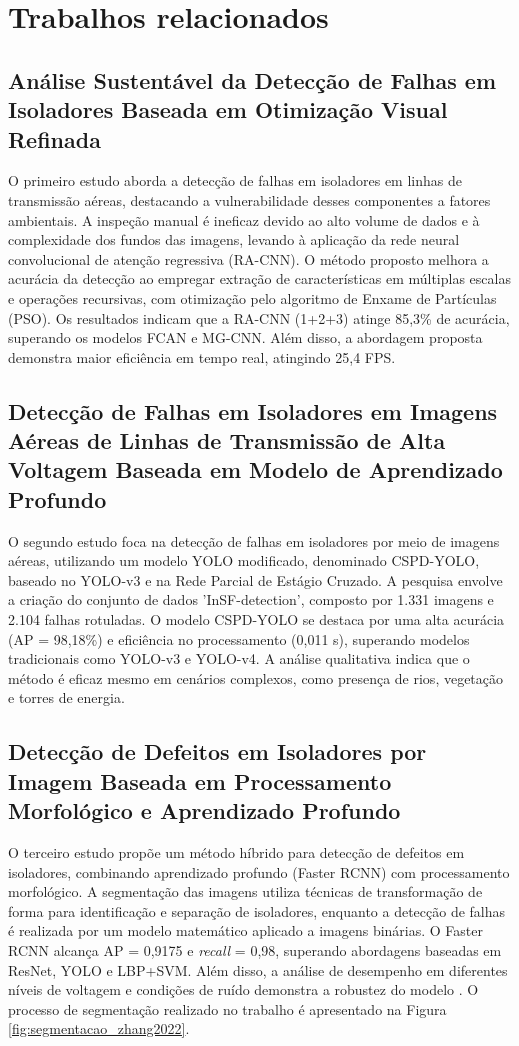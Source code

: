 \chapter{Trabalhos relacionados}

\section{Análise Sustentável da Detecção de Falhas em Isoladores Baseada em Otimização Visual Refinada}
O primeiro estudo aborda a detecção de falhas em isoladores em linhas de transmissão aéreas, destacando a vulnerabilidade desses componentes a fatores ambientais. A inspeção manual é ineficaz devido ao alto volume de dados e à complexidade dos fundos das imagens, levando à aplicação da rede neural convolucional de atenção regressiva (RA-CNN). O método proposto melhora a acurácia da detecção ao empregar extração de características em múltiplas escalas e operações recursivas, com otimização pelo algoritmo de Enxame de Partículas (PSO). Os resultados indicam que a RA-CNN (1+2+3) atinge 85,3\% de acurácia, superando os modelos FCAN e MG-CNN. Além disso, a abordagem proposta demonstra maior eficiência em tempo real, atingindo 25,4 FPS. \cite{wang2023}

\section{Detecção de Falhas em Isoladores em Imagens Aéreas de Linhas de Transmissão de Alta Voltagem Baseada em Modelo de Aprendizado Profundo}
O segundo estudo foca na detecção de falhas em isoladores por meio de imagens aéreas, utilizando um modelo YOLO modificado, denominado CSPD-YOLO, baseado no YOLO-v3 e na Rede Parcial de Estágio Cruzado. A pesquisa envolve a criação do conjunto de dados 'InSF-detection', composto por 1.331 imagens e 2.104 falhas rotuladas. O modelo CSPD-YOLO se destaca por uma alta acurácia (AP = 98,18\%) e eficiência no processamento (0,011 s), superando modelos tradicionais como YOLO-v3 e YOLO-v4. A análise qualitativa indica que o método é eficaz mesmo em cenários complexos, como presença de rios, vegetação e torres de energia. \cite{liu2021}

\section{Detecção de Defeitos em Isoladores por Imagem Baseada em Processamento Morfológico e Aprendizado Profundo}
O terceiro estudo propõe um método híbrido para detecção de defeitos em isoladores, combinando aprendizado profundo (Faster RCNN) com processamento morfológico. A segmentação das imagens utiliza técnicas de transformação de forma para identificação e separação de isoladores, enquanto a detecção de falhas é realizada por um modelo matemático aplicado a imagens binárias. O Faster RCNN alcança AP = 0,9175 e \textit{recall} = 0,98, superando abordagens baseadas em ResNet, YOLO e LBP+SVM. Além disso, a análise de desempenho em diferentes níveis de voltagem e condições de ruído demonstra a robustez do modelo \cite{zhang2022}.
O processo de segmentação realizado no trabalho é apresentado na Figura \ref{fig:segmentacao_zhang2022}.

